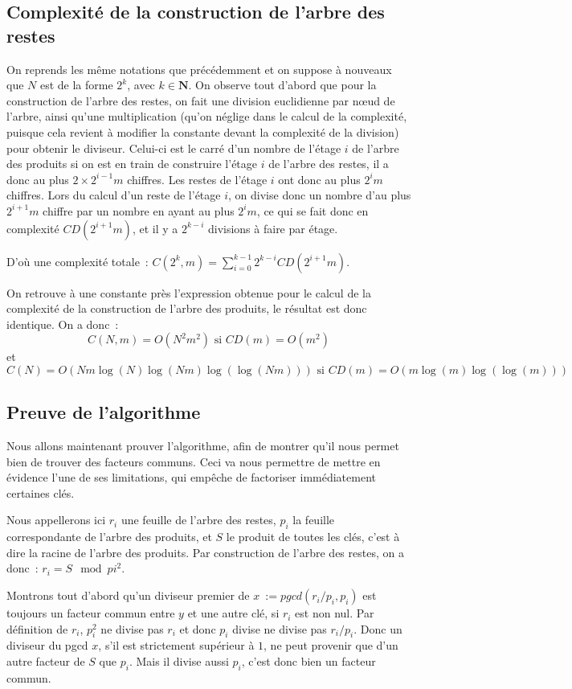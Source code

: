 \documentclass[a4paper,10pt]{article}
\begin{document}
  \subsection{Complexité de la construction de l'arbre des restes}
  On reprends les même notations que précédemment et on suppose à nouveaux que $N$ est de la forme $2^k$, avec $k\in\mathbf{N}$.
  On observe tout d'abord que pour la construction de l'arbre des restes, on fait une division euclidienne par nœud de l'arbre, ainsi qu'une multiplication (qu'on néglige dans le calcul de la complexité, puisque cela revient à modifier la constante devant la complexité de la division) pour obtenir le diviseur. Celui-ci est le carré d'un nombre de l'étage $i$ de l'arbre des produits si on est en train de construire l'étage $i$ de l'arbre des restes, il a donc au plus $2 \times 2^{i-1}m$ chiffres. Les restes de l'étage $i$ ont donc au plus $2^i m$ chiffres.
  Lors du calcul d'un reste de l'étage $i$, on divise donc un nombre d'au plus $2^{i+1}m$ chiffre par un nombre en ayant au plus $2^i m$, ce qui se fait donc en complexité $CD(2^{i+1}m)$, et il y a $2^{k-i}$ divisions à faire par étage.
  
  D'où une complexité totale~: $C(2^k, m) = \sum_{i=0}^{k-1}2^{k-i}CD(2^{i+1}m)$.
  
  On retrouve à une constante près l'expression obtenue pour le calcul de la complexité de la construction de l'arbre des produits, le résultat est donc identique.
  On a donc~:
  \[
   C(N,m) = O(N^2m^2) \text{ si } CD(m) = O(m^2)
  \]
  et
  \[
   C(N) = O(Nm\log(N)\log(Nm)\log(\log(Nm))) \text{ si } CD(m) = O(m\log(m)\log(\log(m)))
  \]
  
  \subsection{Preuve de l'algorithme}
  Nous allons maintenant prouver l'algorithme, afin de montrer qu'il nous permet bien de trouver des facteurs communs.
  Ceci va nous permettre de mettre en évidence l'une de ses limitations, qui empêche de factoriser immédiatement certaines clés.
  
  Nous appellerons ici $r_i$ une feuille de l'arbre des restes, $p_i$ la feuille correspondante de l'arbre des produits, et $S$ le produit de toutes les clés, c'est à dire la racine de l'arbre des produits.
  Par construction de l'arbre des restes, on a donc~: $r_i = S \mod pi^2$.
  
  Montrons tout d'abord qu'un diviseur premier de $x~:= pgcd(r_i/p_i,p_i)$ est toujours un facteur commun entre $y$ et une autre clé, si $r_i$ est non nul. Par définition de $r_i$, $p_i^2$ ne divise pas $r_i$ et donc $p_i$ divise ne divise pas $r_i/p_i$. Donc un diviseur du pgcd $x$, s'il est strictement supérieur à $1$, ne peut provenir que d'un autre facteur de $S$ que $p_i$. Mais il divise aussi $p_i$, c'est donc bien un facteur commun.
  
\end{document}
